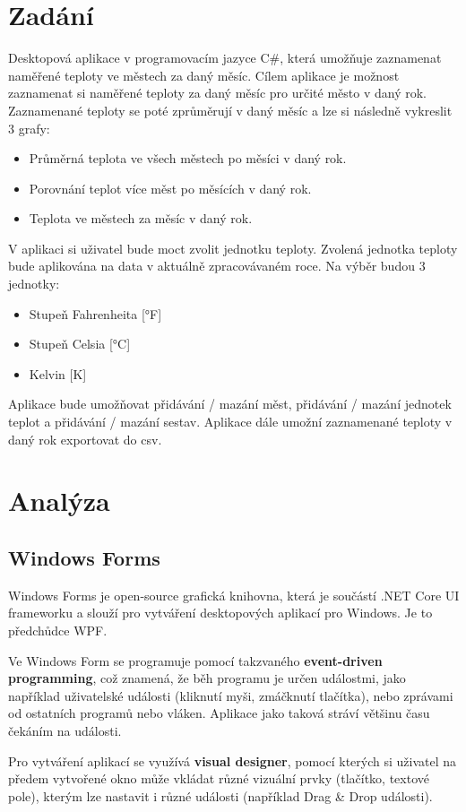 \documentclass[12pt, a4paper]{article}
\begin{document}
\newpage
\tableofcontents

\newpage
\section{Zadání}
Desktopová aplikace v programovacím jazyce C\#, která umožňuje zaznamenat naměřené teploty ve městech za daný měsíc. Cílem aplikace je možnost zaznamenat si naměřené teploty za daný měsíc pro určité město v daný rok. Zaznamenané teploty se poté zprůměrují v daný měsíc a lze si následně vykreslit 3 grafy:
\begin{itemize}
\item Průměrná teplota ve všech městech po měsíci v daný rok.
\item Porovnání teplot více měst po měsících v daný rok.
\item Teplota ve městech za měsíc v daný rok.
\end{itemize}
V aplikaci si uživatel bude moct zvolit jednotku teploty. Zvolená jednotka teploty bude aplikována na data v aktuálně zpracovávaném roce. Na výběr budou 3 jednotky:
\begin{itemize}
\item Stupeň Fahrenheita [°F]
\item Stupeň Celsia [°C]
\item Kelvin [K]
\end{itemize}
Aplikace bude umožňovat přidávání / mazání měst, přidávání / mazání jednotek teplot a přidávání / mazání sestav. Aplikace dále umožní zaznamenané teploty v daný rok exportovat do csv.

\newpage
\section{Analýza}
\subsection{Windows Forms}
Windows Forms je open-source grafická knihovna, která je součástí .NET Core UI frameworku a slouží pro vytváření desktopových aplikací pro Windows. Je to předchůdce WPF.

Ve Windows Form se programuje pomocí takzvaného \textbf{event-driven programming}, což znamená, že běh programu je určen událostmi, jako například uživatelské události (kliknutí myši, zmáčknutí tlačítka), nebo zprávami od ostatních programů nebo vláken. Aplikace jako taková stráví většinu času čekáním na události.

Pro vytváření aplikací se využívá \textbf{visual designer}, pomocí kterých si uživatel na předem vytvořené okno může vkládat různé vizuální prvky (tlačítko, textové pole), kterým lze nastavit i různé události (například Drag \& Drop události).
\end{document}
